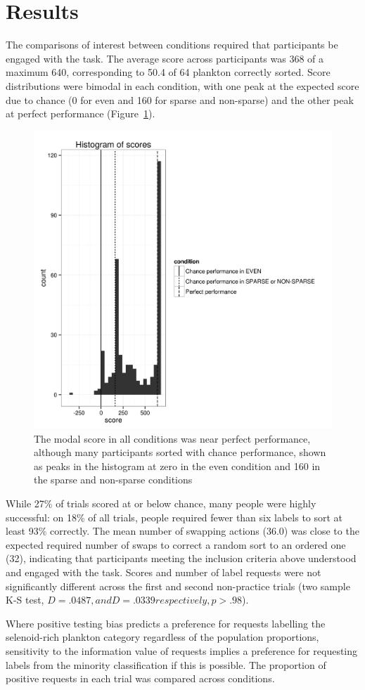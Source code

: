 \documentclass[10pt,letterpaper]{article}
\begin{document}
\section{Results}
The comparisons of interest between conditions required that participants be engaged with the task. The average score across participants was 368 of a maximum 640, corresponding to 50.4 of 64 plankton correctly sorted. Score distributions were bimodal in each condition, with one peak at the expected score due to chance (0 for {\sc even} and 160 for {\sc sparse} and {\sc non-sparse}) and the other peak at perfect performance (Figure~\ref{scorehist}).

\begin{figure}[t]
\centering
\includegraphics[width=.5\textwidth]{scoreshist.png}
\caption{The modal score in all conditions was near perfect performance, although many participants sorted with chance performance, shown as peaks in the histogram at zero in the {\sc even} condition and 160 in the {\sc sparse} and {\sc non-sparse} conditions}
\label{scorehist}
\end{figure}


While 27\% of trials scored at or below chance, many people were highly successful: on 18\% of all trials, people required fewer than six labels to sort at least 93\% correctly. The mean number of swapping actions (36.0) was close to the expected required number of swaps to correct a random sort to an ordered one (32), indicating that participants meeting the inclusion criteria above understood and engaged with the task. Scores and number of label requests were not significantly different across the first and second non-practice trials (two sample K-S test, $D=.0487, and D=.0339 respectively, p>.98$).

Where positive testing bias predicts a preference for requests labelling the selenoid-rich plankton category regardless of the population proportions, sensitivity to the information value of requests implies a preference for requesting labels from the minority classification if this is possible. The proportion of positive requests in each trial was compared across conditions.
\end{document}
